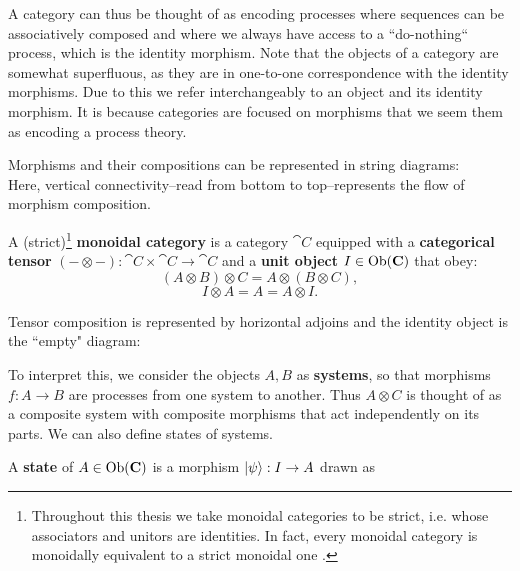 A category can thus be thought of as encoding processes where sequences can be associatively composed  and where we always have access to a ``do-nothing`` process, which is the identity morphism. Note that the objects of a category are somewhat superfluous, as they are in one-to-one correspondence with the identity morphisms. Due to this we refer interchangeably to an object and its identity morphism. It is because categories are focused on morphisms that we seem them as encoding a process theory.

Morphisms and their compositions can be represented in string diagrams:
\begin{equation}
\label{eq:composition}

\end{equation}
\noindent Here, vertical connectivity--read from bottom to top--represents the flow of morphism composition.

\begin{defn}
A (strict)\footnote{Throughout this thesis we take monoidal categories to be strict, i.e. whose associators and unitors are identities.  In fact, every monoidal category is monoidally equivalent to a strict monoidal one \cite{joyal1993braided}.} \textbf{monoidal category} is a category $\cat{C}$ equipped with a \textbf{categorical tensor} $(-\otimes-):\cat{C}\times\cat{C}\to\cat{C}$ and a \textbf{unit object} $I\in\mbox{Ob}(\mathbf{C})$ that obey:
\begin{equation}
(A\otimes B)\otimes C = A\otimes(B\otimes C),
\end{equation}
\begin{equation}
I\otimes A = A = A\otimes I.
\end{equation}
\end{defn}

Tensor composition is represented by horizontal adjoins and the identity object is the ``empty" diagram:
\begin{equation}
\label{eq:tensor}

\end{equation}

To interpret this, we consider the objects $A,B$ as \textbf{systems}, so that morphisms $f:A\to B$ are processes from one system to another. Thus $A\otimes C$ is thought of as a composite system with composite morphisms that act independently on its parts. We can also define states of systems.

\begin{defn}
\label{defn:state}
A \textbf{state} of $A\in\mbox{Ob}(\mathbf{C})$ is a morphism $| \psi \rangle:I\to A$ drawn as
\begin{equation}
\label{eq:state}

\end{equation}
\end{defn}

